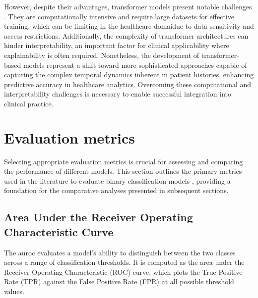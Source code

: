 However, despite their advantages, transformer models present notable challenges \cite{TransformersHealthcareSurvey2023}. They are computationally intensive and require large datasets for effective training, which can be limiting in the healthcare domaidue to data sensitivity and access restrictions. Additionally, the complexity of transformer architectures can hinder interpretability, an important factor for clinical applicability where explainability is often required. Nonetheless, the development of transformer-based models represent a shift toward more sophisticated approaches capable of capturing the complex temporal dynamics inherent in patient histories, enhancing predictive accuracy in healthcare analytics. Overcoming these computational and interpretability challenges is necessary to enable successful integration into clinical practice.


\section{Evaluation metrics}
\label{sec:evaluation_metrics}

Selecting appropriate evaluation metrics is crucial for assessing and comparing the performance of different models. This section outlines the primary metrics used in the literature to evaluate binary classification models \cite{emmert2019comprehensive}, providing a foundation for the comparative analyses presented in subsequent sections.


\subsection{Area Under the Receiver Operating Characteristic Curve}

The \gls{auroc} evaluates a model's ability to distinguish between the two classes across a range of classification thresholds. It is computed as the area under the Receiver Operating Characteristic (ROC) curve, which plots the True Positive Rate (TPR) against the False Positive Rate (FPR) at all possible threshold values.

